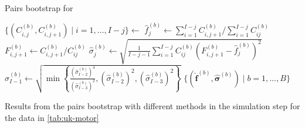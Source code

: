 \documentclass[a4paper]{book}
\begin{document}
\begin{algorithm}[!htb]
  \caption{Pairs bootstrap for }
  \label{alg:pairs-mack}
  \begin{algorithmic}
        \vspace{5pt}
        \State $\{ (C^{(b)}_{i, j}, C^{(b)}_{i, j + 1}) \mid i = 1, \dots, I - j \} \gets$ 
        \vspace{5pt}
        \State $\widehat{f}^{(b)}_j \gets \sum_{i = 1}^{I - j} C^{(b)}_{i, j + 1} / \sum_{i = 1}^{I - j} C^{(b)}_{ij}$
        \vspace{5pt}
          \State $F^{(b)}_{i, j + 1} \gets C^{(b)}_{i, j + 1} / C^{(b)}_{ij}$
          \vspace{5pt}
        \EndFor
          \State $\widehat{\sigma}^{(b)}_j \gets \sqrt{\frac{1}{I - j - 1}\sum_{i = 1}^{I-j} C^{(b)}_{ij}\left( F^{(b)}_{i, j + 1} - \widehat{f}^{(b)}_j \right)^2}$
        \Else
          \State $\widehat{\sigma}^{(b)}_{I - 1} \gets \sqrt{\min{ \left \{ \frac{(\widehat{\sigma}^{(b)}_{I - 2})^4}{(\widehat{\sigma}^{(b)}_{I - 3})^2}, (\widehat{\sigma}^{(b)}_{I - 2})^2, (\widehat{\sigma}^{(b)}_{I - 3})^2 \right \} }}$
        \EndIf
      \EndFor
    \EndFor
    \State \Return $\{ (\widehat{\bm{f}}^{(b)}, \widehat{\bm{\sigma}}^{(b)}) \mid b = 1, \dots, B \}$
  \end{algorithmic}
\end{algorithm}

\begin{table}[!htb]
  \begin{subtable}{0.5\linewidth}
    
  \end{subtable}
  \hfill
  \begin{subtable}{0.5\linewidth}
    
  \end{subtable}
  \caption{Results from the pairs bootstrap with different methods in the simulation step for the data in \cref{tab:uk-motor}}
  \label{tab:mack-pairs}
\end{table}
\end{document}
